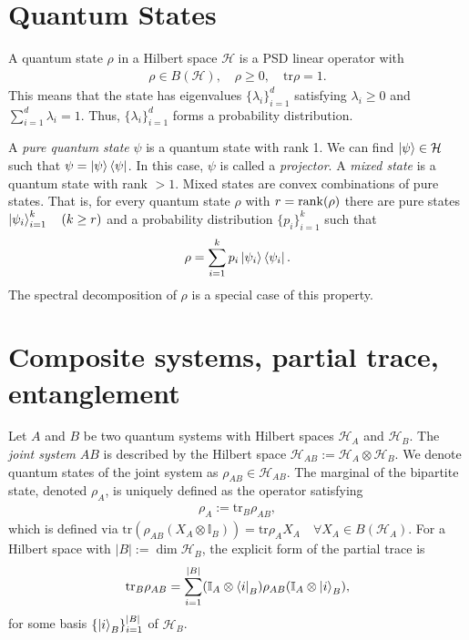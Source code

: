 \documentclass[../../note.tex]{subfiles}
\begin{document}
\section{Quantum States}
A quantum state $\rho$ in a Hilbert space $\mathcal{H}$ is a PSD linear operator with
\begin{align}
    \rho \in B(\mathcal{H}), \quad \rho \geq 0, \quad \text{tr}\rho =1.
\end{align}
This means that the state has eigenvalues $\{\lambda_i\}_{i=1}^d$ satisfying $\lambda_i\geq 0$ and $\sum_{i=1}^d \lambda_i =1$. Thus, $\{\lambda_i\}_{i=1}^d$ forms a probability distribution. 

A \textit{pure quantum state} $\psi$ is a quantum state with rank 1. We can find $\ket{\psi}\in \mathcal{H}$ such that $\psi =\ket{\psi}\bra{\psi}$. In this case, $\psi$ is called a \textit{projector}. A \textit{mixed state} is a quantum state with rank $>1$. Mixed states are convex combinations of pure states. That is, for every quantum state $\rho$ with $r=\operatorname{rank}(\rho)$ there are pure states $\ket{\psi_i}_{i=1}^k \quad (k\geq r)$ and a probability distribution $\{p_i\}_{i=1}^k$ such that 
\begin{align}
    \rho=\sum_{i=1}^k p_i \ket{\psi_i}\bra{\psi_i}.
\end{align}
The spectral decomposition of $\rho$ is a special case of this property. 
\section{Composite systems, partial trace, entanglement}
Let $A$ and $B$ be two quantum systems with Hilbert spaces $\mathcal{H}_A$ and $\mathcal{H}_B$. The \textit{joint system} $AB$ is described by the Hilbert space $\mathcal{H}_{AB}:=\mathcal{H}_A \otimes \mathcal{H}_B$. We denote quantum states of the joint system as $\rho_{AB}\in \mathcal{H}_{AB}$. The marginal of the bipartite state, denoted $\rho_A$, is uniquely defined as the operator satisfying
\begin{align}
    \rho_{A}:=\text{tr}_B\rho_{AB}, 
\end{align}
which is defined via $\text{tr}(\rho_{AB}(X_{A}\otimes \mathbb{I}_B))=\text{tr}\rho_A X_A \quad \forall X_A \in B(\mathcal{H}_A)$. For a Hilbert space with $|B|:=\dim\mathcal{H}_B$, the explicit form of the partial trace is
\begin{align}
    \text{tr}_B \rho_{AB}=\sum_{i=1}^{|B|}(\mathbb{I}_A \otimes \bra{i}_B)\rho_{AB} (\mathbb{I}_A\otimes \ket{i}_B),
\end{align}
for some basis $\{\ket{i}_B\}_{i=1}^{|B|}$ of $\mathcal{H}_B$. 
\end{document}

